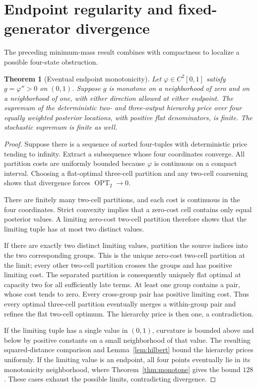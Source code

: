 \documentclass[11pt]{article}
\newtheorem{theorem}{Theorem}[section]
\theoremstyle{definition}\newtheorem{definition}[theorem]{Definition}
\theoremstyle{remark}\newtheorem{remark}[theorem]{Remark}
\newcommand{\ph}{\varphi}
\newcommand{\OPT}{\operatorname{OPT}}
\begin{document}
\section{Endpoint regularity and fixed-generator divergence}
\label{sec:endpoints}
The preceding minimum-mass result combines with compactness to localize a possible four-state obstruction.
\begin{theorem}[Eventual endpoint monotonicity]
\label{thm:endpoints}
Let $\ph\in C^2[0,1]$ satisfy $g=\ph''>0$ on $(0,1)$. Suppose $g$ is monotone on a neighborhood of zero and on a neighborhood of one, with either direction allowed at either endpoint. The supremum of the deterministic two- and three-output hierarchy price over four equally weighted posterior locations, with positive flat denominators, is finite. The stochastic supremum is finite as well.
\end{theorem}
\begin{proof}
Suppose there is a sequence of sorted four-tuples with deterministic price tending to infinity. Extract a subsequence whose four coordinates converge. All partition costs are uniformly bounded because $\ph$ is continuous on a compact interval. Choosing a flat-optimal three-cell partition and any two-cell coarsening shows that divergence forces $\OPT_2\to0$.

There are finitely many two-cell partitions, and each cost is continuous in the four coordinates. Strict convexity implies that a zero-cost cell contains only equal posterior values. A limiting zero-cost two-cell partition therefore shows that the limiting tuple has at most two distinct values.

If there are exactly two distinct limiting values, partition the source indices into the two corresponding groups. This is the unique zero-cost two-cell partition at the limit; every other two-cell partition crosses the groups and has positive limiting cost. The separated partition is consequently uniquely flat optimal at capacity two for all sufficiently late terms. At least one group contains a pair, whose cost tends to zero. Every cross-group pair has positive limiting cost. Thus every optimal three-cell partition eventually merges a within-group pair and refines the flat two-cell optimum. The hierarchy price is then one, a contradiction.

If the limiting tuple has a single value in $(0,1)$, curvature is bounded above and below by positive constants on a small neighborhood of that value. The resulting squared-distance comparison and Lemma~\ref{lem:hilbert} bound the hierarchy prices uniformly. If the limiting value is an endpoint, all four points eventually lie in its monotonicity neighborhood, where Theorem~\ref{thm:monotone} gives the bound $128$. These cases exhaust the possible limits, contradicting divergence.
\end{proof}
\end{document}
